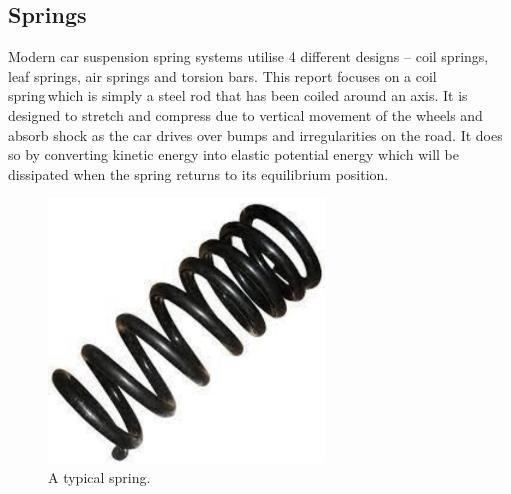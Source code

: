 \documentclass[11pt]{article}
\begin{document}
\subsection{Springs}
Modern car suspension spring systems utilise 4 different designs – coil springs, leaf springs, air springs and torsion bars. This report focuses on a coil spring which is simply a steel rod that has been coiled around an axis. It is designed to stretch and compress due to vertical movement of the wheels and absorb shock as the car drives over bumps and irregularities on the road. It does so by converting kinetic energy into elastic potential energy which will be dissipated when the spring returns to its equilibrium position.
\begin{figure}[H]
    \centering
    \includegraphics[height = 7cm]{./img/spring1.png}
    \caption{A typical spring.}
    \label{fig:spring1}
\end{figure}
\end{document}
